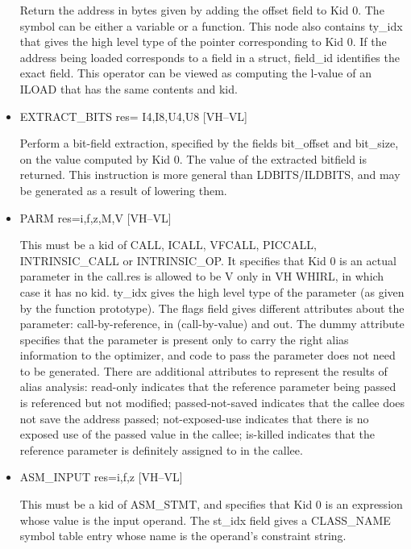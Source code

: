 \documentclass{article}
\begin{document}
\begin{itemize}
Return the address in bytes given by adding the offset field to
Kid 0. The symbol can be either a variable or a function. This node
also contains
ty\_idx that gives the high level type of the pointer corresponding
to Kid 0. If the address being loaded corresponds to a field in a
struct, field\_id identifies the exact field. This operator can be
viewed as computing the l-value of an
%
ILOAD that has the same contents and kid.

%
\item  EXTRACT\_BITS res= I4,I8,U4,U8 \hfill [VH--VL]

Perform a bit-field extraction, specified by the fields bit\_offset
and bit\_size, on the value computed by Kid 0. The value of the
extracted bitfield is returned. This instruction is more general
than
%
%
LDBITS/ILDBITS, and may be generated as a result of lowering
them.


\item
{}%
PARM res=i,f,z,M,V \hfill [VH--VL]

This must be a kid of CALL, ICALL, VFCALL,
%
PICCALL, 
%
INTRINSIC\_CALL or
%
INTRINSIC\_OP. It specifies that Kid 0 is an actual parameter in
the call.res is allowed to be V only in VH WHIRL, in which case it
has no kid.
ty\_idx gives the high level type of the parameter (as given by the
function prototype). The flags field gives different attributes
about the parameter: call-by-reference, in (call-by-value) and out.
The dummy attribute specifies that the parameter is present only
to carry the right alias information to the optimizer, and code to
pass the parameter does not need to be generated. There are
additional attributes to represent the results of alias analysis:
read-only indicates that the reference parameter being passed
is referenced but not modified; passed-not-saved indicates that the
callee does not save the address passed; not-exposed-use indicates
that there is no exposed use of the passed value in the callee;
is-killed indicates that the reference parameter is definitely
assigned to in the callee. 

%
\item  ASM\_INPUT res=i,f,z \hfill [VH--VL]

This must be a kid of ASM\_STMT, and specifies that Kid 0 is an
expression whose value is the input operand. The st\_idx field
gives a CLASS\_NAME symbol table entry whose name is the operand's constraint
string.


\end{itemize}
\end{document}
